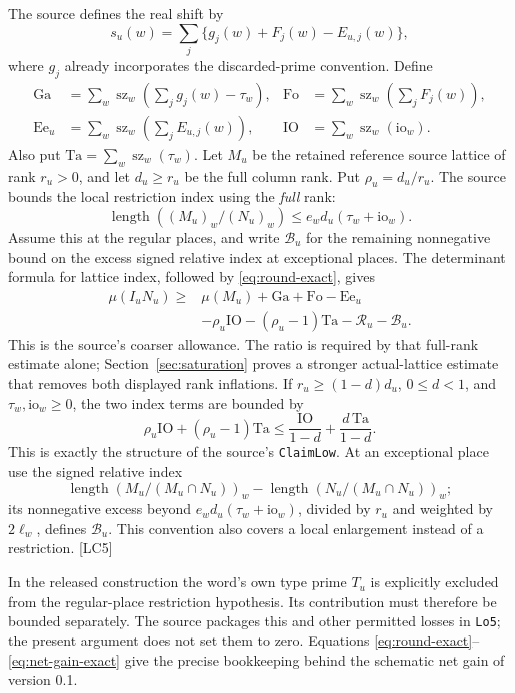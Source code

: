 \documentclass[11pt,a4paper]{article}
\numberwithin{equation}{section}
\theoremstyle{remark}\newtheorem{remark}[theorem]{Remark}
\begin{document}
The source defines the real shift by
\[
s_u(w)=\sum_j\{g_j(w)+F_j(w)-E_{u,j}(w)\},
\]
where $g_j$ already incorporates the discarded-prime convention. Define
\begin{align*}
\mathrm{Ga}&=\sum_w\operatorname{sz}_w\!\left(\sum_jg_j(w)-\tau_w\right),&
\mathrm{Fo}&=\sum_w\operatorname{sz}_w\!\left(\sum_jF_j(w)\right),\\
\mathrm{Ee}_u&=\sum_w\operatorname{sz}_w\!\left(\sum_jE_{u,j}(w)\right),&
\mathrm{IO}&=\sum_w\operatorname{sz}_w(\mathrm{io}_w).
\end{align*}
Also put $\mathrm{Ta}=\sum_w\operatorname{sz}_w(\tau_w)$. Let $M_u$ be the retained reference source lattice of rank $r_u>0$, and let $d_u\ge r_u$ be the full column rank. Put $\rho_u=d_u/r_u$. The source bounds the local restriction index using the \emph{full} rank:
\[
\operatorname{length}((M_u)_w/(N_u)_w)
\le e_w d_u(\tau_w+\mathrm{io}_w).
\]
Assume this at the regular places, and write $\mathcal B_u$ for the remaining nonnegative bound on the excess signed relative index at exceptional places. The determinant formula for lattice index, followed by \eqref{eq:round-exact}, gives
\begin{equation}\label{eq:net-gain-exact}
\begin{split}
\mu(I_uN_u)\ge{}&\mu(M_u)+\mathrm{Ga}+\mathrm{Fo}-\mathrm{Ee}_u\\
&-\rho_u\mathrm{IO}-(\rho_u-1)\mathrm{Ta}-\mathcal R_u-\mathcal B_u.
\end{split}
\end{equation}
This is the source's coarser allowance. The ratio is required by that full-rank estimate alone; Section~\ref{sec:saturation} proves a stronger actual-lattice estimate that removes both displayed rank inflations. If $r_u\ge(1-d)d_u$, $0\le d<1$, and $\tau_w,\mathrm{io}_w\ge0$, the two index terms are bounded by
\[
\rho_u\mathrm{IO}+(\rho_u-1)\mathrm{Ta}
\le\frac{\mathrm{IO}}{1-d}+\frac{d\,\mathrm{Ta}}{1-d}.
\]
This is exactly the structure of the source's \texttt{ClaimLow}. At an exceptional place use the signed relative index
\[
\operatorname{length}(M_u/(M_u\cap N_u))_w
-\operatorname{length}(N_u/(M_u\cap N_u))_w;
\]
its nonnegative excess beyond $e_wd_u(\tau_w+\mathrm{io}_w)$, divided by $r_u$ and weighted by $2\ell_w$, defines $\mathcal B_u$. This convention also covers a local enlargement instead of a restriction. \textsf{[LC5]}

In the released construction the word's own type prime $T_u$ is explicitly excluded from the regular-place restriction hypothesis. Its contribution must therefore be bounded separately. The source packages this and other permitted losses in \texttt{Lo5}; the present argument does not set them to zero. Equations \eqref{eq:round-exact}--\eqref{eq:net-gain-exact} give the precise bookkeeping behind the schematic net gain of version 0.1.\cite{local-div-defs,local-costs}
\end{document}
